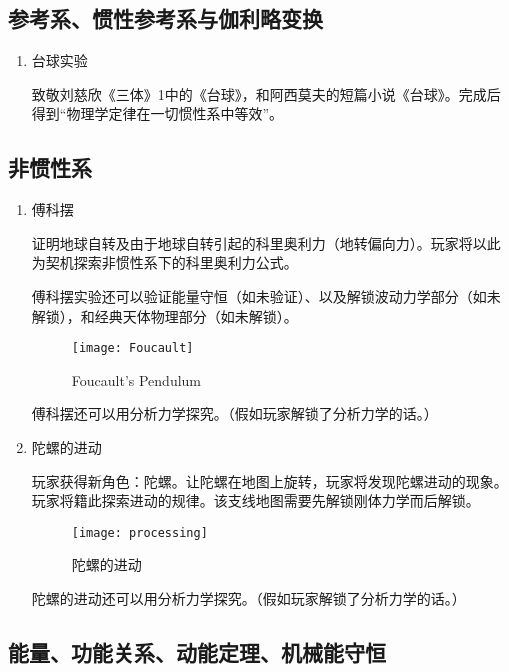 \documentclass{tstextbook}
\begin{document}
\subsection{参考系、惯性参考系与伽利略变换}

\begin{enumerate}

\item{台球实验}

致敬刘慈欣《三体》1中的《台球》，和阿西莫夫的短篇小说《台球》。完成后得到“物理学定律在一切惯性系中等效”。

\end{enumerate}

\subsection{非惯性系}

\begin{enumerate}

\item{傅科摆}

证明地球自转及由于地球自转引起的科里奥利力（地转偏向力）。玩家将以此为契机探索非惯性系下的科里奥利力公式。

傅科摆实验还可以验证能量守恒（如未验证）、以及解锁波动力学部分（如未解锁），和经典天体物理部分（如未解锁）。

\begin{figure}[H]
\centering 
\texttt{[image: Foucault]} 
\caption{Foucault's Pendulum} 
\label{Foucault} 
\end{figure}

傅科摆还可以用分析力学探究。（假如玩家解锁了分析力学的话。）

\item{陀螺的进动}

玩家获得新角色：陀螺。让陀螺在地图上旋转，玩家将发现陀螺进动的现象。玩家将籍此探索进动的规律。该支线地图需要先解锁刚体力学而后解锁。

\begin{figure}[H]
\centering 
\texttt{[image: processing]} 
\caption{陀螺的进动} 
\label{processing} 
\end{figure}

陀螺的进动还可以用分析力学探究。（假如玩家解锁了分析力学的话。）

\end{enumerate}

\subsection{能量、功能关系、动能定理、机械能守恒}
\end{document}
